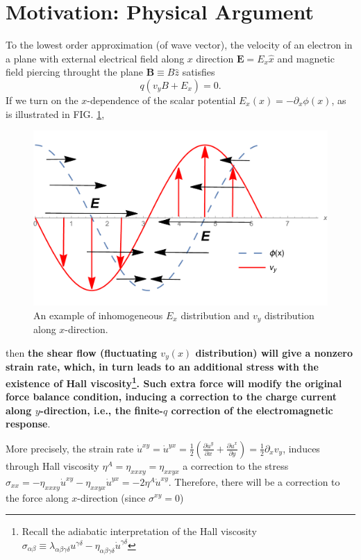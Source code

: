 \documentclass[10pt,nofootinbib,letterpaper]{revtex4}
\begin{document}
\section{Motivation: Physical Argument}
	To the lowest order approximation (of wave vector), the velocity of an electron in a plane with external electrical field along $x$ direction $\bm{E}=E_x\hat{x}$ and magnetic field piercing throught the plane $\bm{B}\equiv B\hat{z}$ satisfies
	\begin{equation}\label{1.1.1}
		q(v_yB+E_x)=0.
	\end{equation}
	If we turn on the $x$-dependence of the scalar potential $E_x(x)=-\partial_x\phi(x)$, as is illustrated in FIG. \ref{Fig:flow},
	\begin{figure}[!htp]
		\centering
		\includegraphics[scale=0.4]{Flow.pdf}
		\caption{An example of inhomogeneous $E_x$ distribution and $v_y$ distribution along $x$-direction.}
		\label{Fig:flow}
	\end{figure}
	then \textbf{the shear flow (fluctuating $v_y(x)$ distribution) will give a nonzero strain rate, which, in turn leads to an additional stress with the existence of Hall viscosity\footnote{Recall the adiabatic interpretation of the Hall viscosity $\sigma_{\alpha\beta}\equiv\lambda_{\alpha\beta\gamma\delta}u^{\gamma\delta}-\eta_{\alpha\beta\gamma\delta}\dot{u}^{\gamma\delta}$}. Such extra force will modify the original force balance condition, inducing a correction to the charge current along $y$-direction, i.e., the finite-$q$ correction of the electromagnetic response}.\par
	More precisely, the strain rate $\dot{u}^{xy}=\dot{u}^{yx}=\frac12(\frac{\partial\dot{u}^y}{\partial x}+\frac{\partial\dot{u}^x}{\partial y})=\frac12 \partial_x v_y$, induces through Hall viscosity $\eta^A=\eta_{xxxy}=\eta_{xxyx}$ a correction to the stress $\sigma_{xx}=-\eta_{xxxy}\dot{u}^{xy}-\eta_{xxyx}\dot{u}^{yx}=-2\eta^A\dot{u}^{xy}$. Therefore, there will be a correction to the force along $x$-direction (since $\sigma^{xy}=0$)
\end{document}

